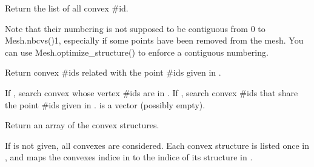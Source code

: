 \documentclass[a4paper,11pt,english]{sphinxmanual}
\begin{document}
\begin{fulllineitems}
\begin{fulllineitems}
\end{fulllineitems}


\begin{fulllineitems}
\label{\detokenize{python/cmdref_Mesh:getfem.Mesh.cvid}}
Return the list of all convex \#id.

Note that their numbering is not supposed to be contiguous from
0 to Mesh.nbcvs()\sphinxhyphen{}1,
especially if some points have been removed from the mesh. You
can use Mesh.optimize\_structure() to enforce a contiguous
numbering.

\end{fulllineitems}


\begin{fulllineitems}
\label{\detokenize{python/cmdref_Mesh:getfem.Mesh.cvid_from_pid}}
Return convex \#ids related with the point \#ids given in .

If , search convex whose vertex \#ids are in .
If , search convex \#ids that share the point \#ids
given in .  is a  vector (possibly
empty).

\end{fulllineitems}


\begin{fulllineitems}
\label{\detokenize{python/cmdref_Mesh:getfem.Mesh.cvstruct}}
Return an array of the convex structures.

If  is not given, all convexes are considered. Each convex
structure is listed once in , and  maps the convexes
indice in  to the indice of its structure in .

\end{fulllineitems}


\end{fulllineitems}
\end{document}

